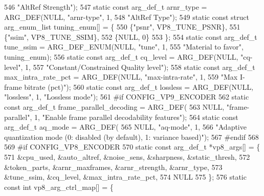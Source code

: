 \begin{DoxyCodeInclude}
{{{{{{{{{546                                                \textcolor{stringliteral}{"AltRef Strength"});
547 \textcolor{keyword}{static} \textcolor{keyword}{const} arg\_def\_t arnr\_type = ARG\_DEF(NULL, \textcolor{stringliteral}{"arnr-type"}, 1,
548                                            \textcolor{stringliteral}{"AltRef Type"});
549 \textcolor{keyword}{static} \textcolor{keyword}{const} \textcolor{keyword}{struct }arg\_enum\_list tuning\_enum[] = \{
550   \{\textcolor{stringliteral}{"psnr"}, VP8\_TUNE\_PSNR\},
551   \{\textcolor{stringliteral}{"ssim"}, VP8\_TUNE\_SSIM\},
552   \{NULL, 0\}
553 \};
554 \textcolor{keyword}{static} \textcolor{keyword}{const} arg\_def\_t tune\_ssim = ARG\_DEF\_ENUM(NULL, \textcolor{stringliteral}{"tune"}, 1,
555                                                 \textcolor{stringliteral}{"Material to favor"}, tuning\_enum);
556 \textcolor{keyword}{static} \textcolor{keyword}{const} arg\_def\_t cq\_level = ARG\_DEF(NULL, \textcolor{stringliteral}{"cq-level"}, 1,
557                                           \textcolor{stringliteral}{"Constant/Constrained Quality level"});
558 \textcolor{keyword}{static} \textcolor{keyword}{const} arg\_def\_t max\_intra\_rate\_pct = ARG\_DEF(NULL, \textcolor{stringliteral}{"max-intra-rate"}, 1,
559                                                     \textcolor{stringliteral}{"Max I-frame bitrate (pct)"});
560 \textcolor{keyword}{static} \textcolor{keyword}{const} arg\_def\_t lossless = ARG\_DEF(NULL, \textcolor{stringliteral}{"lossless"}, 1, \textcolor{stringliteral}{"Lossless mode"});
561 \textcolor{preprocessor}{#if CONFIG\_VP9\_ENCODER}
562 \textcolor{keyword}{static} \textcolor{keyword}{const} arg\_def\_t frame\_parallel\_decoding  = ARG\_DEF(
563     NULL, \textcolor{stringliteral}{"frame-parallel"}, 1, \textcolor{stringliteral}{"Enable frame parallel decodability features"});
564 \textcolor{keyword}{static} \textcolor{keyword}{const} arg\_def\_t aq\_mode  = ARG\_DEF(
565     NULL, \textcolor{stringliteral}{"aq-mode"}, 1,
566     \textcolor{stringliteral}{"Adaptive quantization mode (0: disabled (by default), 1: variance based)"});
567 \textcolor{preprocessor}{#endif}
568 
569 \textcolor{preprocessor}{#if CONFIG\_VP8\_ENCODER}
570 \textcolor{keyword}{static} \textcolor{keyword}{const} arg\_def\_t *vp8\_args[] = \{
571   &cpu\_used, &auto\_altref, &noise\_sens, &sharpness, &static\_thresh,
572   &token\_parts, &arnr\_maxframes, &arnr\_strength, &arnr\_type,
573   &tune\_ssim, &cq\_level, &max\_intra\_rate\_pct,
574   NULL
575 \};
576 \textcolor{keyword}{static} \textcolor{keyword}{const} \textcolor{keywordtype}{int} vp8\_arg\_ctrl\_map[] = \{
}}}}}}}}}
\end{DoxyCodeInclude}
